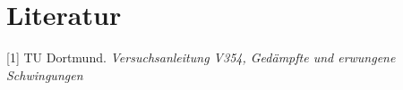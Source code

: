 \section{Literatur}
[1] \; TU Dortmund. \textit{Versuchsanleitung V354, Gedämpfte und erwungene Schwingungen}


